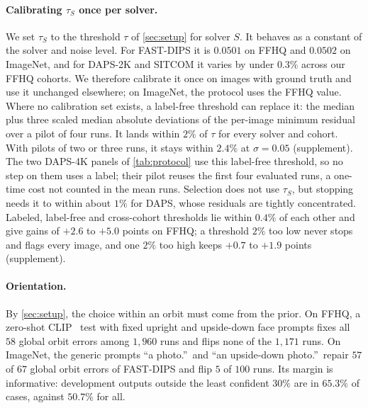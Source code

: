 \paragraph{Calibrating $\tau_S$ once per solver.}
We set $\tau_S$ to the threshold $\tau$ of \cref{sec:setup} for solver $S$.
It behaves as a constant of the solver and noise level.
For FAST-DIPS it is $0.0501$ on FFHQ and $0.0502$ on ImageNet, and for DAPS-2K and SITCOM it varies by under $0.3\%$ across our FFHQ cohorts.
We therefore calibrate it once on images with ground truth and use it unchanged elsewhere; on ImageNet, the protocol uses the FFHQ value.
Where no calibration set exists, a label-free threshold can replace it: the median plus three scaled median absolute deviations of the per-image minimum residual over a pilot of four runs.
It lands within $2\%$ of $\tau$ for every solver and cohort.
With pilots of two or three runs, it stays within $2.4\%$ at $\sigma=0.05$ (supplement).
The two DAPS-4K panels of \cref{tab:protocol} use this label-free threshold, so no step on them uses a label; their pilot reuses the first four evaluated runs, a one-time cost not counted in the mean runs.
Selection does not use $\tau_S$, but stopping needs it to within about $1\%$ for DAPS, whose residuals are tightly concentrated.
Labeled, label-free and cross-cohort thresholds lie within $0.4\%$ of each other and give gains of $+2.6$ to $+5.0$ points on FFHQ; a threshold $2\%$ too low never stops and flags every image, and one $2\%$ too high keeps $+0.7$ to $+1.9$ points (supplement).

\paragraph{Orientation.}
By \cref{sec:setup}, the choice within an orbit must come from the prior.
On FFHQ, a zero-shot CLIP~\cite{radford2021clip} test with fixed upright and upside-down face prompts fixes all $58$ global orbit errors among $1{,}960$ runs and flips none of the $1{,}171$ \good runs.
On ImageNet, the generic prompts ``a photo.''\ and ``an upside-down photo.''\ repair $57$ of $67$ global orbit errors of FAST-DIPS and flip $5$ of $100$ \good runs.
Its margin is informative: development outputs outside the least confident $30\%$ are \good in $65.3\%$ of cases, against $50.7\%$ for all.


